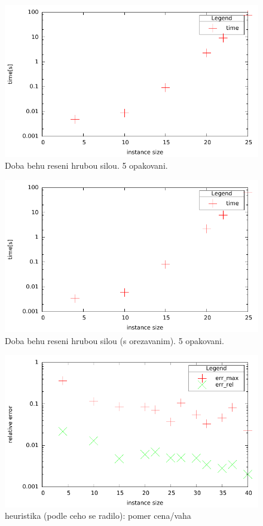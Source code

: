\documentclass[12pt,a4paper]{article}
\begin{document}
\begin{figure}[H]
	\caption{Doba behu reseni hrubou silou. 5 opakovani. }
	\includegraphics{./time_b0.pdf}
\end{figure}

\begin{figure}[H]
	\caption{Doba behu reseni hrubou silou (s orezavanim). 5 opakovani. }
	\includegraphics{./time_b1.pdf}
\end{figure}

\begin{figure}[H]
	\caption{heuristika (podle ceho se radilo): pomer cena/vaha}
	\includegraphics{./err_h1.pdf}
\end{figure}
\end{document}
